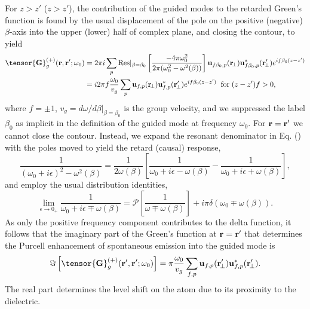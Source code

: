 \documentclass[preprint,aps,pra,onecolumn]{revtex4-1} %
\begin{document}
For $z>z'$ ($z>z'$), the contribution of the guided modes to the retarded Green's function is found by the 
usual displacement of the pole on the positive (negative) $\beta$-axis into the upper (lower) half of 
complex plane, and closing the contour, to yield
\begin{align}
\tensor{\mathbf{G}}^{(+)}_g(\br,\br'; \omega_0) &= 2\pi i \sum_{p}  {\rm Res}\vert_{\beta =\beta_0} 
\left[\frac{-4\pi \omega_0^2}{2\pi (\omega_0^2-\omega^2(\beta))}\right]  \mathbf{u}_{f\beta_0, p} 
(\br\!_\perp)\mathbf{u}^*_{f\beta_0, p} (\br_{\!\perp}^\prime)e^{if \beta_0 (z-z')} \nonumber \\
&  =  i 2\pi f \frac{\omega_0}{v_g } \sum_{p} \mathbf{u}_{f, p} (\br\!_\perp)\mathbf{u}^*_{f , p} 
(\br_{\!\perp}^\prime) e^{if \beta_0(z-z')}\;\; {\rm for }\;  (z-z')f>0,
\label{eq:Gganaly}
\end{align}
where $f=\pm 1$, $v_g= d\omega/d\beta \vert_{\beta=\beta_0}$ is the group velocity, and we suppressed 
the label $\beta_0$ as implicit in the definition of the guided mode at frequency $\omega_0$. For 
$\mathbf{r}=\mathbf{r}'$ we cannot close the contour. Instead, we expand the resonant denominator in Eq. () with the 
poles moved to yield the retard (causal) response,
\begin{equation}
\frac{1}{(\omega_0+i\epsilon)^2-\omega^2(\beta)}=\frac{1}{2 \omega(\beta)}\left[ \frac{1}{\omega_0+ i 
\epsilon - \omega(\beta)} - \frac{1}{\omega_0+ i \epsilon + \omega(\beta)} \right],
\end{equation}
 and employ the usual distribution identities,
\begin{equation}
\lim_{\epsilon \rightarrow 0_+} \frac{1}{\omega_0 + i \epsilon \mp 
\omega(\beta)}=\mathcal{P}\left[\frac{1}{\omega \mp \omega(\beta)} \right] + i \pi \delta (\omega_0 \mp 
\omega(\beta)).
\end{equation}
As only the positive frequency component contributes to the delta function, it follows that the imaginary 
part of the Green's function at $\mathbf{r} = \mathbf{r}'$ that determines the Purcell enhancement of spontaneous 
emission into the guided mode is
\begin{equation}
\Im\left[\tensor{\mathbf{G}}^{(+)}_g(\br',\br'; \omega_0) \right] = \pi \frac{\omega_0}{v_g } \sum_{f, p} 
\mathbf{u}_{f, p} (\br_{\!\perp}^\prime)\mathbf{u}^*_{f , p} (\br_{\!\perp}^\prime).
\end{equation}
The real part determines the level shift on the atom due to its proximity to the dielectric.
\end{document}
